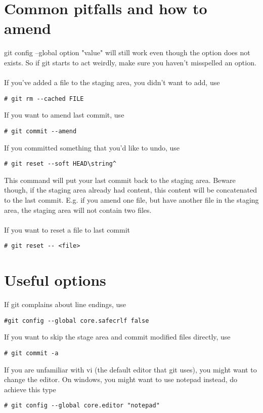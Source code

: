 \documentclass[10pt,a4paper]{article}
\begin{document}
\section{Common pitfalls and how to amend}
git config --global option "value" will still work even though the option does not exists. So if git starts to act weirdly, make sure you haven't misspelled an option.
\\\\
If you've added a file to the staging area, you didn't want to add, use
\begin{lstlisting}
# git rm --cached FILE
\end{lstlisting}
If you want to amend last commit, use
\begin{lstlisting}
# git commit --amend
\end{lstlisting}
If you committed something that you'd like to undo, use
\begin{lstlisting}
# git reset --soft HEAD\string^
\end{lstlisting}
This command will put your last commit back to the staging area. Beware though, if the staging area already had content, this content will be concatenated to the last commit. E.g. if you amend one file, but have another file in the staging area, the staging area will not contain two files.
\\\\
If you want to reset a file to last commit
\begin{lstlisting}
# git reset -- <file>
\end{lstlisting}

\section{Useful options}
If git complains about line endings, use
\begin{lstlisting}
#git config --global core.safecrlf false
\end{lstlisting}
If you want to skip the stage area and commit modified files directly, use
\begin{lstlisting}
# git commit -a 
\end{lstlisting}
If you are unfamiliar with vi (the default editor that git uses), you might want to change the editor. On windows, you might want to use notepad instead, do achieve this type 
\begin{lstlisting}
# git config --global core.editor "notepad"
\end{lstlisting}
\end{document}
